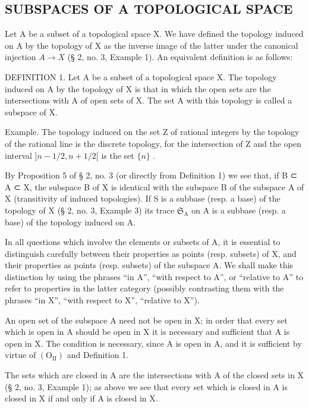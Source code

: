 \subsection{SUBSPACES OF A TOPOLOGICAL SPACE}

Let A be a subset of a topological space X. We have defined the topology induced on A by the topology of X as the inverse image of the latter under the canonical injection \(A \rightarrow X\) (§ 2, no. 3, Example 1). An equivalent definition is as follows:

DEFINITION 1. Let A be a subset of a topological space X. The topology induced on A by the topology of X is that in which the open sets are the intersections with A of open sets of X. The set A with this topology is called a subspace of X.

Example. The topology induced on the set Z of rational integers by the topology of the rational line is the discrete topology, for the intersection of Z and the open interval \(]n - 1/2, n + 1/2[\) is the set \(\{n\}\) .

By Proposition 5 of § 2, no. 3 (or directly from Definition 1) we see that, if B ⊂ A ⊂ X, the subspace B of X is identical with the subspace B of the subspace A of X (transitivity of induced topologies). If S is a subbase (resp. a base) of the topology of X (§ 2, no. 3, Example 3) its trace \(\mathfrak{S}_{\mathrm{A}}\) on A is a subbase (resp. a base) of the topology induced on A.

In all questions which involve the elements or subsets of A, it is essential to distinguish carefully between their properties as points (resp. subsets) of X, and their properties as points (resp. subsets) of the subspace A. We shall make this distinction by using the phrases ``in A'', ``with respect to A'', or ``relative to A'' to refer to properties in the latter category (possibly contrasting them with the phrases ``in X'', ``with respect to X'', ``relative to X'').

An open set of the subspace A need not be open in X; in order that every set which is open in A should be open in X it is necessary and sufficient that A is open in X. The condition is necessary, since A is open in A, and it is sufficient by virtue of \((\mathrm{O}_{\mathrm{II}})\) and Definition 1.

The sets which are closed in A are the intersections with A of the closed sets in X (§ 2, no. 3, Example 1); as above we see that every set which is closed in A is closed in X if and only if A is closed in X.

